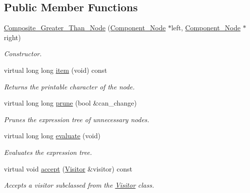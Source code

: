 \subsection*{Public Member Functions}
\begin{DoxyCompactItemize}
\item 
\hyperlink{classMadara_1_1Expression__Tree_1_1Composite__Greater__Than__Node_a47c3f269beae47f8a33dea5e662f68c9}{Composite\_\-Greater\_\-Than\_\-Node} (\hyperlink{classMadara_1_1Expression__Tree_1_1Component__Node}{Component\_\-Node} $\ast$left, \hyperlink{classMadara_1_1Expression__Tree_1_1Component__Node}{Component\_\-Node} $\ast$right)
\begin{DoxyCompactList}\small\item\em Constructor. \item\end{DoxyCompactList}\item 
virtual long long \hyperlink{classMadara_1_1Expression__Tree_1_1Composite__Greater__Than__Node_a181eee226ff472daa3d3acd4b09c2df5}{item} (void) const 
\begin{DoxyCompactList}\small\item\em Returns the printable character of the node. \item\end{DoxyCompactList}\item 
virtual long long \hyperlink{classMadara_1_1Expression__Tree_1_1Composite__Greater__Than__Node_a0c392aaaa2c3d420284ed932eebabf0d}{prune} (bool \&can\_\-change)
\begin{DoxyCompactList}\small\item\em Prunes the expression tree of unnecessary nodes. \item\end{DoxyCompactList}\item 
virtual long long \hyperlink{classMadara_1_1Expression__Tree_1_1Composite__Greater__Than__Node_a8133ecbdc83e2da78399fca68bfe256c}{evaluate} (void)
\begin{DoxyCompactList}\small\item\em Evaluates the expression tree. \item\end{DoxyCompactList}\item 
virtual void \hyperlink{classMadara_1_1Expression__Tree_1_1Composite__Greater__Than__Node_a58e3e46c3b4268c2de62073245f7a6eb}{accept} (\hyperlink{classMadara_1_1Expression__Tree_1_1Visitor}{Visitor} \&visitor) const 
\begin{DoxyCompactList}\small\item\em Accepts a visitor subclassed from the \hyperlink{classMadara_1_1Expression__Tree_1_1Visitor}{Visitor} class. \item\end{DoxyCompactList}\item 

\end{DoxyCompactItemize}
